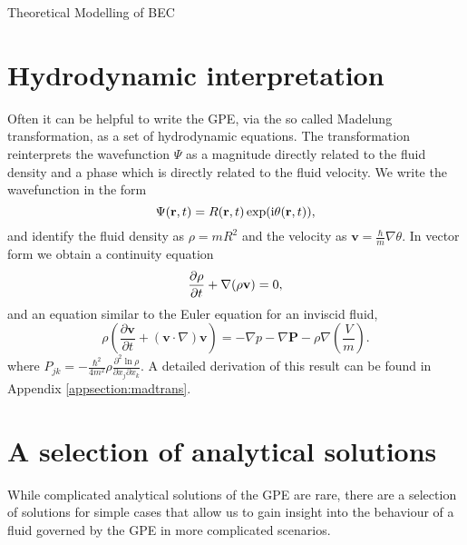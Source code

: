 \begin{chapter}{\label{cha:theoretical_model}Theoretical Modelling of BEC}
\section{\label{section:hydrodynamic} Hydrodynamic interpretation}
	Often it can be helpful to write the GPE, via the so called Madelung transformation, as a set of hydrodynamic equations. The transformation reinterprets the wavefunction $\Psi$ as a magnitude directly related to the fluid density and a phase which is directly related to the fluid velocity. We write the wavefunction in the form
	\begin{equation}
		\Psi({\bf r},t) = R({\bf r},t)\exp (\mathrm{i}\theta({\bf r},t)),
	\end{equation}
	 and identify the fluid density as $\rho=mR^2$ and the velocity as $\mathbf{v} = \frac{\hbar}{m}\nabla\theta$.
	In vector form we obtain a continuity equation
	\begin{equation}
	  \frac{\partial \rho}{\partial t} + \nabla(\rho{\bf v}) = 0,
	  \label{eq:MTcont}
	\end{equation}
	and an equation similar to the Euler equation for an inviscid fluid,
	\begin{equation}
	\rho\left( \frac{\partial \mathbf{v}}{\partial t} + \left( \mathbf{v} \cdot \nabla \right)\mathbf{v} \right) = -\nabla p - \nabla \mathbf{P} - \rho \nabla \left(\frac{V}{m}\right).
	\end{equation}
	where $P_{jk} = -\frac{\hbar^2}{4m^2}\rho\frac{\partial^2\ln{\rho}}{\partial x_j \partial x_k}$.
	A detailed derivation of this result can be found in Appendix \ref{appsection:madtrans}.

\section{\label{section:solutions} A selection of analytical solutions}
	While complicated analytical solutions of the GPE are rare, there are a selection of solutions for simple cases that allow us to gain insight into the behaviour of a fluid governed by the GPE in more complicated scenarios.

\end{chapter}
